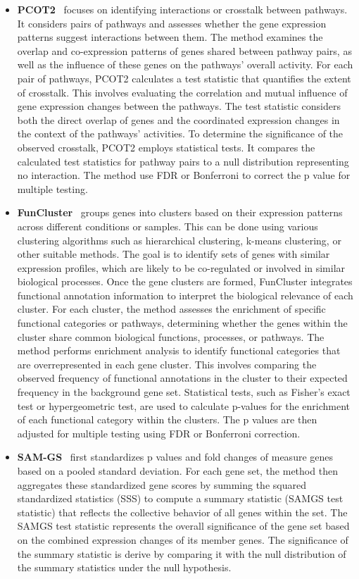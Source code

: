 \documentclass[Minh_PhD_thesis.tex]{subfiles}
\begin{document}
\begin{itemize}
\item \textbf{PCOT2}~\cite{kong2006multivariate} focuses on identifying interactions or crosstalk between pathways. It considers pairs of pathways and assesses whether the gene expression patterns suggest interactions between them. The method examines the overlap and co-expression patterns of genes shared between pathway pairs, as well as the influence of these genes on the pathways' overall activity. For each pair of pathways, PCOT2 calculates a test statistic that quantifies the extent of crosstalk. This involves evaluating the correlation and mutual influence of gene expression changes between the pathways. The test statistic considers both the direct overlap of genes and the coordinated expression changes in the context of the pathways’ activities. To determine the significance of the observed crosstalk, PCOT2 employs statistical tests. It compares the calculated test statistics for pathway pairs to a null distribution representing no interaction. The method use FDR or Bonferroni to correct the p value for multiple testing.

\item \textbf{FunCluster}~\cite{henegar2006clustering}  groups genes into clusters based on their expression patterns across different conditions or samples. This can be done using various clustering algorithms such as hierarchical clustering, k-means clustering, or other suitable methods.
The goal is to identify sets of genes with similar expression profiles, which are likely to be co-regulated or involved in similar biological processes. Once the gene clusters are formed, FunCluster integrates functional annotation information to interpret the biological relevance of each cluster.
For each cluster, the method assesses the enrichment of specific functional categories or pathways, determining whether the genes within the cluster share common biological functions, processes, or pathways. The method performs enrichment analysis to identify functional categories that are overrepresented in each gene cluster. This involves comparing the observed frequency of functional annotations in the cluster to their expected frequency in the background gene set.
Statistical tests, such as Fisher's exact test or hypergeometric test, are used to calculate p-values for the enrichment of each functional category within the clusters. The p values are then adjusted for multiple testing using FDR or Bonferroni correction.

\item \textbf{SAM-GS}~\cite{dinu2007improving} first standardizes p values and fold changes of measure genes based on a pooled standard deviation. For each gene set, the method then aggregates these standardized gene scores by summing the squared standardized statistics (SSS) to compute a summary statistic (SAMGS test statistic) that reflects the collective behavior of all genes within the set. The SAMGS test statistic represents the overall significance of the gene set based on the combined expression changes of its member genes. The significance of the summary statistic is derive by comparing it with the null distribution of the summary statistics under the null hypothesis.


\end{itemize}
\end{document}
